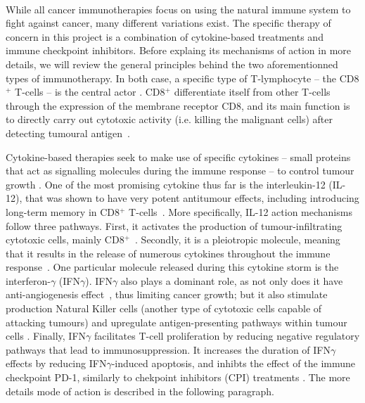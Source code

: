 \documentclass[11pt]{article}
\begin{document}
~
\par While all cancer immunotherapies focus on using the natural immune system to fight against cancer, many different variations exist. The specific therapy of concern in this project is a combination of cytokine-based treatments and immune checkpoint inhibitors. Before explaing its mechanisms of action in more details, we will review the general principles behind the two aforementionned types of immunotherapy. In both case, a specific type of T-lymphocyte -- the CD8$^+$ T-cells -- is the central actor \cite{ReviewCPI}. CD8$^+$ differentiate itself from other T-cells through the expression of the membrane receptor CD8, and its main function is to directly carry out cytotoxic activity (i.e. killing the malignant cells) after detecting tumoural antigen~\cite{cd8Effects}.
\par Cytokine-based therapies seek to make use of specific cytokines -- small proteins that act as signalling molecules during the immune response -- to control tumour growth \cite{ioDef}. One of the most promising cytokine thus far is the interleukin-12 (IL-12), that was shown to have very potent antitumour effects, including introducing long-term memory in CD8$^+$ T-cells~\cite{il12IsCool}. More specifically, IL-12 action mechanisms follow three pathways. First, it activates the production of tumour-infiltrating cytotoxic cells, mainly CD8$^+$~\cite{cd8FirstWay}. Secondly, it is a pleiotropic molecule, meaning that it results in the release of numerous cytokines throughout the immune response~\cite{il12CytokineStorm}. One particular molecule released during this cytokine storm is the interferon-$\gamma$ (IFN$\gamma$). IFN$\gamma$ also plays a dominant role, as not only does it have anti-angiogenesis effect~\cite{ifngAngiogenesis}, thus limiting cancer growth; but it also stimulate production Natural Killer cells \cite{ifngNKProd} (another type of cytotoxic cells capable of attacking tumours) and upregulate antigen-presenting pathways within tumour cells \cite{ifngAntigenExposure}. Finally, IFN$\gamma$ facilitates T-cell proliferation by reducing negative regulatory pathways that lead to immunosuppression. It  increases the duration of IFN$\gamma$ effects by reducing IFN$\gamma$-induced apoptosis, and inhibts the effect of the immune checkpoint PD-1, similarly to chekpoint inhibitors (CPI) treatments \cite{reducImmunoSuppression}. The more details mode of action is described in the following paragraph.
\end{document}
